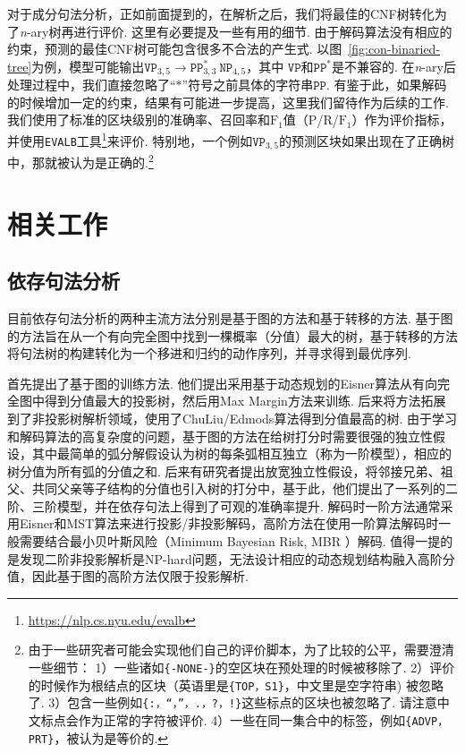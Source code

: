 对于成分句法分析，正如前面提到的，在解析之后，我们将最佳的CNF树转化为了\textit{n}-ary树再进行评价.
这里有必要提及一些有用的细节.
由于解码算法没有相应的约束，预测的最佳CNF树可能包含很多不合法的产生式.
以图~\ref{fig:con-binaried-tree}为例，模型可能输出$\texttt{VP}_{3,5} \rightarrow \texttt{PP}^{\ast}_{3,3} ~ \texttt{NP}_{4,5}$，其中 $\texttt{VP}$和$\texttt{PP}^{\ast}$是不兼容的.
在\textit{n}-ary后处理过程中，我们直接忽略了``$\mathtt{\ast}$''符号之前具体的字符串$\texttt{PP}$.
有鉴于此，如果解码的时候增加一定的约束，结果有可能进一步提高，这里我们留待作为后续的工作.
我们使用了标准的区块级别的准确率、召回率和$\mathrm{F}_1$值（$\mathrm{P}$/$\mathrm{R}$/$\mathrm{F}_1$）作为评价指标，并使用\texttt{EVALB}工具\footnote{\url{https://nlp.cs.nyu.edu/evalb}}来评价.
特别地，一个例如$\texttt{VP}_{3,5}$的预测区块如果出现在了正确树中，那就被认为是正确的.\footnote{
    由于一些研究者可能会实现他们自己的评价脚本，为了比较的公平，需要澄清一些细节：
    1）一些诸如\texttt{\{-NONE-\}}的空区块在预处理的时候被移除了.
    2）评价的时候作为根结点的区块（英语里是\texttt{\{TOP，S1\}}，中文里是空字符串) 被忽略了.
    3）包含一些例如\texttt{\{:，``，''，.，?，!\}}这些标点的区块也被忽略了. 请注意中文标点会作为正常的字符被评价.
    4）一些在同一集合中的标签，例如\texttt{\{ADVP，PRT\}}，被认为是等价的.}

\section{相关工作}
\label{sec:relworks}

\subsection{依存句法分析}

目前依存句法分析的两种主流方法分别是基于图的方法和基于转移的方法.
基于图的方法旨在从一个有向完全图中找到一棵概率（分值）最大的树，基于转移的方法将句法树的构建转化为一个移进和归约的动作序列，并寻求得到最优序列.

\citet{mcdonald-etal-2005-online}首先提出了基于图的训练方法.
他们提出采用基于动态规划的Eisner算法从有向完全图中得到分值最大的投影树，然后用Max Margin方法来训练.
后来\citet{mcdonald-etal-2005-non}将方法拓展到了非投影树解析领域，使用了ChuLiu/Edmods算法\citep{chu-1965-shortest}得到分值最高的树.
由于学习和解码算法的高复杂度的问题，基于图的方法在给树打分时需要很强的独立性假设，其中最简单的弧分解假设认为树的每条弧相互独立（称为一阶模型），相应的树分值为所有弧的分值之和.
后来有研究者提出放宽独立性假设，将邻接兄弟、祖父、共同父亲等子结构的分值也引入树的打分中，基于此，他们提出了一系列的二阶\citep{mcdonald-pereira-2006-online,carreras-2007-experiments}、三阶\citep{koo-collins-2010-efficient}模型，并在依存句法上得到了可观的准确率提升.
解码时一阶方法通常采用Eisner和MST算法来进行投影/非投影解码，高阶方法在使用一阶算法解码时一般需要结合最小贝叶斯风险（Minimum Bayesian Risk, MBR ）解码\citep{smith-smith-2007-probabilistic}.
值得一提的是\citet{mcdonald-pereira-2006-online}发现二阶非投影解析是NP-hard问题，无法设计相应的动态规划结构融入高阶分值，因此基于图的高阶方法仅限于投影解析.

